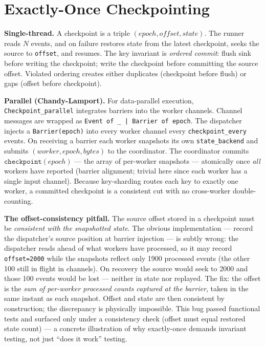 \documentclass[11pt,a4paper]{article}
\begin{document}
\section{Exactly-Once Checkpointing}

\textbf{Single-thread.} A checkpoint is a triple $(epoch, offset, state)$.
The runner reads $N$ events, and on failure restores state from the
latest checkpoint, seeks the source to \texttt{offset}, and resumes.
The key invariant is \emph{ordered commit}: flush sink before writing
the checkpoint; write the checkpoint before committing the source
offset. Violated ordering creates either duplicates (checkpoint before
flush) or gaps (offset before checkpoint).

\textbf{Parallel (Chandy-Lamport).} For data-parallel execution,
\texttt{Checkpoint\_parallel} integrates barriers into the worker
channels. Channel messages are wrapped as
\texttt{Event of \_ | Barrier of epoch}. The dispatcher injects a
\texttt{Barrier(epoch)} into every worker channel every
\texttt{checkpoint\_every} events. On receiving a barrier each worker
snapshots its own \texttt{state\_backend} and submits
$(worker, epoch, bytes)$ to the coordinator. The coordinator commits
$\mathtt{checkpoint}(epoch)$ — the array of per-worker snapshots —
atomically once {\it all} workers have reported (barrier alignment;
trivial here since each worker has a single input channel). Because
key-sharding routes each key to exactly one worker, a committed
checkpoint is a consistent cut with no cross-worker double-counting.

\textbf{The offset-consistency pitfall.} The source offset stored in a
checkpoint must be \emph{consistent with the snapshotted state}. The
obvious implementation — record the dispatcher's source position at
barrier injection — is subtly wrong: the dispatcher reads ahead of what
workers have processed, so it may record \texttt{offset=2000} while the
snapshots reflect only 1900 processed events (the other 100 still in
flight in channels). On recovery the source would seek to 2000 and those
100 events would be lost — neither in state nor replayed. The fix: the
offset is the \emph{sum of per-worker processed counts captured at the
barrier}, taken in the same instant as each snapshot. Offset and state
are then consistent by construction; the discrepancy is physically
impossible. This bug passed functional tests and surfaced only under a
consistency check (offset must equal restored state count) — a concrete
illustration of why exactly-once demands invariant testing, not just
``does it work'' testing.
\end{document}

